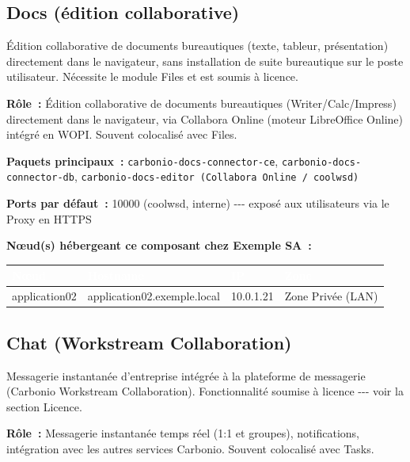 \documentclass[11pt,a4paper]{report}
\newcommand{\tblhead}[1]{\textcolor{white}{\textbf{#1}}}
\begin{document}
\subsection{Docs (édition collaborative)}

Édition collaborative de documents bureautiques (texte, tableur, présentation) directement dans le navigateur, sans installation de suite bureautique sur le poste utilisateur.\allowbreak{} Nécessite le module Files et est soumis à licence.\allowbreak{}

\textbf{Rôle~:} Édition collaborative de documents bureautiques (Writer/Calc/Impress) directement dans le navigateur, via Collabora Online (moteur LibreOffice Online) intégré en WOPI.\allowbreak{} Souvent colocalisé avec Files.\allowbreak{}

\textbf{Paquets principaux~:} \texttt{carbonio-\allowbreak{}docs-\allowbreak{}connector-\allowbreak{}ce}, \texttt{carbonio-\allowbreak{}docs-\allowbreak{}connector-\allowbreak{}db}, \texttt{carbonio-\allowbreak{}docs-\allowbreak{}editor (Collabora Online / coolwsd)}

\textbf{Ports par défaut~:} 10000 (coolwsd, interne) -\allowbreak{}-\allowbreak{}-\allowbreak{} exposé aux utilisateurs via le Proxy en HTTPS

\textbf{Nœud(s) hébergeant ce composant chez Exemple SA~:}
\begin{longtable}{|p{3.2cm}|p{4.5cm}|p{3.2cm}|p{2.3cm}|}
\hline
\rowcolor{primary}\tblhead{Nœud} & \tblhead{Hostname} & \tblhead{IP} & \tblhead{Zone} \\
\hline
\endhead
application02 & application02.\allowbreak{}exemple.\allowbreak{}local & 10.\allowbreak{}0.\allowbreak{}1.\allowbreak{}21 & Zone Privée (LAN) \\
\hline
\end{longtable}


\subsection{Chat (Workstream Collaboration)}

Messagerie instantanée d'entreprise intégrée à la plateforme de messagerie (Carbonio Workstream Collaboration).\allowbreak{} Fonctionnalité soumise à licence -\allowbreak{}-\allowbreak{}-\allowbreak{} voir la section Licence.\allowbreak{}

\textbf{Rôle~:} Messagerie instantanée temps réel (1:1 et groupes), notifications, intégration avec les autres services Carbonio.\allowbreak{} Souvent colocalisé avec Tasks.\allowbreak{}
\end{document}
